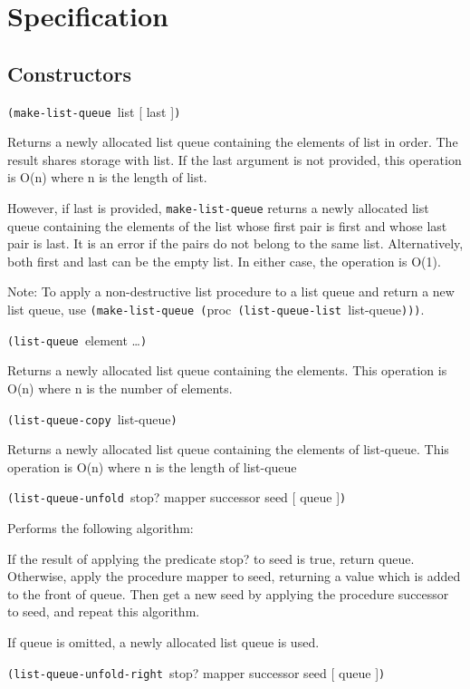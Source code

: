 \section{Specification}\label{specification}

\subsection{Constructors}\label{Constructors}

\texttt{(make-list-queue\ }list {[} last {]}\texttt{)}

Returns a newly allocated list queue containing the elements of list in
order. The result shares storage with list. If the last argument is not
provided, this operation is O(n) where n is the length of list.

However, if last is provided, \texttt{make-list-queue} returns a newly
allocated list queue containing the elements of the list whose first
pair is first and whose last pair is last. It is an error if the pairs
do not belong to the same list. Alternatively, both first and last can
be the empty list. In either case, the operation is O(1).

Note: To apply a non-destructive list procedure to a list queue and
return a new list queue, use
\texttt{(make-list-queue\ (}proc\texttt{\ (list-queue-list\ }list-queue\texttt{)))}.

\texttt{(list-queue\ }element \ldots{}\texttt{)}

Returns a newly allocated list queue containing the elements. This
operation is O(n) where n is the number of elements.

\texttt{(list-queue-copy\ }list-queue\texttt{)}

Returns a newly allocated list queue containing the elements of
list-queue. This operation is O(n) where n is the length of list-queue

\texttt{(list-queue-unfold\ }stop? mapper successor seed {[} queue
{]}\texttt{)}

Performs the following algorithm:

If the result of applying the predicate stop? to seed is true, return
queue. Otherwise, apply the procedure mapper to seed, returning a value
which is added to the front of queue. Then get a new seed by applying
the procedure successor to seed, and repeat this algorithm.

If queue is omitted, a newly allocated list queue is used.

\texttt{(list-queue-unfold-right\ }stop? mapper successor seed {[} queue
{]}\texttt{)}

